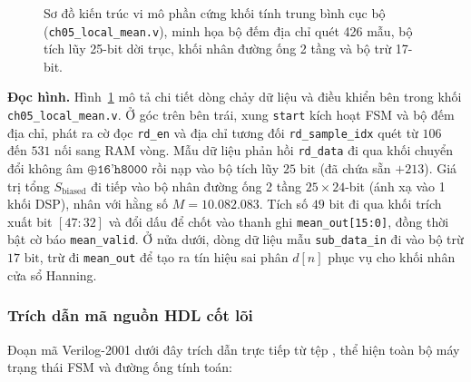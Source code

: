 \begin{figure}[H]
\centering
\resizebox{\textwidth}{!}{}
\caption{Sơ đồ kiến trúc vi mô phần cứng khối tính trung bình cục bộ (\texttt{ch05\_local\_mean.v}), minh họa bộ đếm địa chỉ quét 426 mẫu, bộ tích lũy 25-bit dời trục, khối nhân đường ống 2 tầng và bộ trừ 17-bit.}
\label{fig:ch05_local_mean_arch}
\end{figure}

\textbf{Đọc hình.} Hình~\ref{fig:ch05_local_mean_arch} mô tả chi tiết dòng chảy dữ liệu và điều khiển bên trong khối \texttt{ch05\_local\_mean.v}. Ở góc trên bên trái, xung \texttt{start} kích hoạt FSM và bộ đếm địa chỉ, phát ra cờ đọc \texttt{rd\_en} và địa chỉ tương đối \texttt{rd\_sample\_idx} quét từ $106$ đến $531$ nối sang RAM vòng. Mẫu dữ liệu phản hồi \texttt{rd\_data} đi qua khối chuyển đổi không âm $\oplus \texttt{16'h8000}$ rồi nạp vào bộ tích lũy $25\text{ bit}$ (đã chứa sẵn $+213$). Giá trị tổng $S_{\text{biased}}$ đi tiếp vào bộ nhân đường ống 2 tầng $25 \times 24$-bit (ánh xạ vào 1 khối DSP), nhân với hằng số $M = 10.082.083$. Tích số $49\text{ bit}$ đi qua khối trích xuất bit $[47:32]$ và đổi dấu để chốt vào thanh ghi \texttt{mean\_out[15:0]}, đồng thời bật cờ báo \texttt{mean\_valid}. Ở nửa dưới, dòng dữ liệu mẫu \texttt{sub\_data\_in} đi vào bộ trừ $17\text{ bit}$, trừ đi \texttt{mean\_out} để tạo ra tín hiệu sai phân $d[n]$ phục vụ cho khối nhân cửa sổ Hanning.

\subsubsection*{Trích dẫn mã nguồn HDL cốt lõi}
Đoạn mã Verilog-2001 dưới đây trích dẫn trực tiếp từ tệp , thể hiện toàn bộ máy trạng thái FSM và đường ống tính toán:



